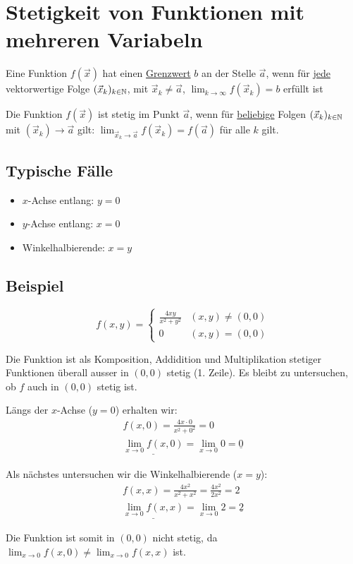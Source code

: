\section{Stetigkeit von Funktionen mit mehreren Variabeln}
\begin{definition}[Grenzwert]
Eine Funktion $f(\vec{x})$ hat einen \underline{Grenzwert} $b$ an der Stelle
$\vec{a}$, wenn für \underline{jede} vektorwertige Folge $(\vec{x}_k)_{k \in \mathbb{N}}$,
mit $\vec{x}_k \neq \vec{a}$, $\lim_{k \to \infty}f(\vec{x}_k) = b$ erfüllt ist
\end{definition}
\begin{definition}[Stetigkeit]
Die Funktion $f(\vec{x})$ ist stetig im Punkt $\vec{a}$, wenn für
\underline{beliebige} Folgen $(\vec{x}_k)_{k \in \mathbb{N}}$ mit
$(\vec{x}_k) \to \vec{a}$ gilt: $\lim_{\vec{x}_k \to \vec{a}} f(\vec{x}_k) = f(\vec{a})$
für alle $k$ gilt.
\end{definition}

\subsection{Typische Fälle}
\begin{itemize}
	\item $x$-Achse entlang: $y = 0$
	\item $y$-Achse entlang: $x = 0$
	\item Winkelhalbierende: $x = y$
\end{itemize}

\subsection*{Beispiel}
\[
f(x, y) = \begin{cases}
	\frac{4xy}{x^2 + y^2} & (x,y) \neq (0,0)\\
	0 & (x,y) = (0,0)
\end{cases}
\]

Die Funktion ist als Komposition, Addidition und Multiplikation stetiger
Funktionen überall ausser in $(0,0)$ stetig (1. Zeile). Es bleibt zu untersuchen,
ob $f$ auch in $(0,0)$ stetig ist.

Längs der $x$-Achse ($y = 0$) erhalten wir:
\begin{align*}
f(x, 0) = \frac{4x \cdot 0}{x^2 + 0^2} = 0\\
\underline{\lim_{x \to 0} f(x, 0)} = \lim_{x \to 0} 0 = \underline{0}
\end{align*}

Als nächstes untersuchen wir die Winkelhalbierende ($x = y$):
\begin{align*}
f(x, x) = \frac{4x^2}{x^2 + x^2} = \frac{4x^2}{2x^2} = 2\\
\underline{\lim_{x \to 0} f(x, x)} = \lim_{x \to 0} 2 = \underline{2}
\end{align*}

Die Funktion ist somit in $(0,0)$ nicht stetig, da
$\lim_{x \to 0} f(x, 0) \neq \lim_{x \to 0} f(x, x)$ ist.